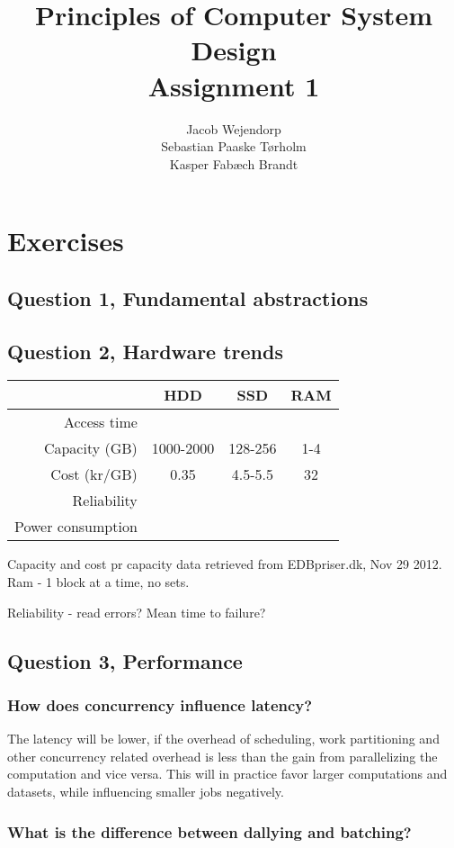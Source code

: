 \documentclass[11pt,a4paper]{article}
\title{Principles of Computer System Design\\Assignment 1}
\author{Jacob Wejendorp\\Sebastian Paaske Tørholm\\Kasper Fabæch Brandt}
\begin{document}
\maketitle
\section{Exercises}
\subsection{Question 1, Fundamental abstractions}

\subsection{Question 2, Hardware trends}

\begin{tabular}{|r|c|c|c|}
    \hline
                    & HDD & SSD & RAM\\\hline
    Access time     & & & \\\hline
    Capacity (GB)   & 1000-2000 & 128-256 & 1-4 \\\hline
    Cost (kr/GB)    & 0.35 & 4.5-5.5 & 32 \\\hline
    Reliability     & & & \\\hline
    Power consumption & & & \\\hline

\end{tabular}
Capacity and cost pr capacity data retrieved from EDBpriser.dk, Nov 29 2012.
Ram - 1 block at a time, no sets.

Reliability - read errors? Mean time to failure?


\subsection{Question 3, Performance}
\subsubsection{How does concurrency influence latency?}

The latency will be lower, if the overhead of scheduling, work partitioning and
other concurrency related overhead is less than the gain from parallelizing the
computation and vice versa. This will in practice favor larger computations and
datasets, while influencing smaller jobs negatively.

\subsubsection{What is the difference between dallying and batching?}
\end{document}
